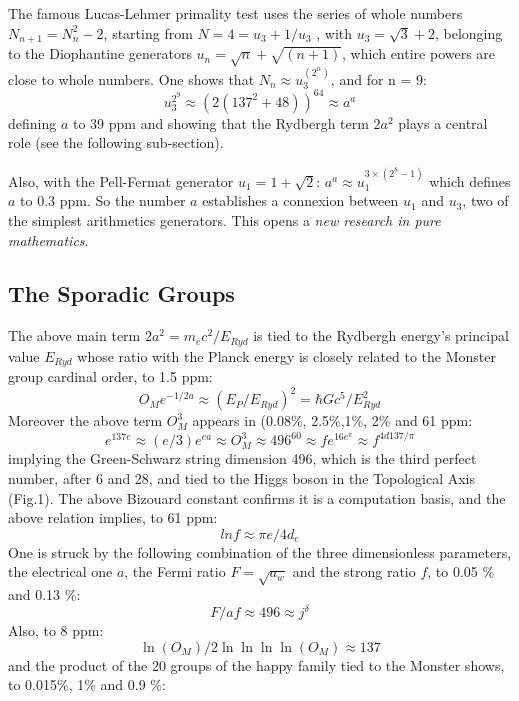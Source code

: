 \documentclass[twoside,draft]{article}
\begin{document}
\begin{sloppypar}
{The famous Lucas-Lehmer primality test uses the series of whole numbers $N_{n+1} = N_{n}^{2}-2$,
starting from $N = 4 = u_{3} + 1/u_{3}$ , with $u_{3} = \sqrt{3} + 2$, belonging to the Diophantine generators $u_{n} = \sqrt{n} + \sqrt{(n+1)}$, which entire powers are close to whole numbers. One shows that $N_{n} \approx u_{3}^{(2^{n})}$, and for n = 9:
\begin{equation}
u_{3}^{2^9} \approx (2(137^{2} + 48))^{64} \approx a^{a}
\end{equation}
defining $a$ to 39 ppm and showing that the Rydbergh term $2a^2$ plays a central role (see the following sub-section).

Also, with the Pell-Fermat generator $u_{1} = 1 + \sqrt{2}$:
$a^{a} \approx u_1^{3\times(2^{8}-1)}$
which defines $a$ to 0.3 ppm. So the number $a$ establishes a connexion between $u_{1}$ and $u_{3}$, two of the
simplest arithmetics generators. This opens a \textit{new research in pure mathematics}.

\subsection{The Sporadic Groups}

The above main term $2a^{2} = m_{e} c^{2}/E_{Ryd}$ is
tied to the Rydbergh energy's principal value $E_{Ryd}$ whose ratio with the Planck energy is closely
related to the Monster group cardinal order, to 1.5 ppm:
\begin{equation}
O_{M} e^{-1/2a} \approx (E_{P} /E_{Ryd})^{2} = \hbar Gc^{5}/E_{Ryd}^{2}
\end{equation}
Moreover the above term $O_M^3$ appears in (0.08\%, 2.5\%,1\%, 2\% and 61 ppm:
$$e^{137e}\approx (e/3)e^{ea}\approx O_M^3 \approx 496^{60} \approx fe^{16e^\pi} \approx f^{4d137/\pi}$$
implying the Green-Schwarz string dimension 496, which is the third perfect number, after 6 and 28, and tied to the Higgs boson in the Topological Axis (Fig.1). The above Bizouard constant confirms it is a computation basis, and the above relation implies, to 61 ppm:
\begin{equation}
lnf\approx \pi e/4d_e
\end{equation}
One is struck by the following combination of the three dimensionless parameters, the electrical
one $a$, the Fermi ratio $F =\sqrt{a_{w}}$ and the strong ratio $f$, to 0.05 \% and 0.13 \%:
\begin{equation}
F/af \approx 496\approx j^{\delta}
\end{equation}
Also, to 8 ppm: $$\ln(O_{M}) /2\ln\ln\ln\ln(O_{M}) \approx 137$$ and the product of the 20 groups of the happy family tied
to the Monster shows, to 0.015\%, 1\% and 0.9 \%:

}
\end{sloppypar}
\end{document}
